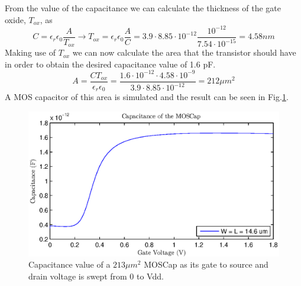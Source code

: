 From the value of the capacitance we can calculate the thickness of the gate oxide, \(T_{ox}\), as
\begin{equation*}
	C = \epsilon_r\epsilon_0\frac{A}{T_{ox}} \rightarrow T_{ox} = \epsilon_r\epsilon_0\frac{A}{C} = 3.9\cdot8.85\cdot10^{-12}\frac{10^{-12}}{7.54\cdot10^{-15}}=4.58 nm
\end{equation*}
Making use of \(T_{ox}\) we can now calculate the area that the transistor should have in order to obtain the desired capacitance value of 1.6 pF.
\begin{equation*}
	A = \frac{CT_{ox}}{\epsilon_r\epsilon_0}=\frac{1.6\cdot10^{-12}\cdot4.58\cdot10^{-9}}{3.9\cdot8.85\cdot10^{-12}} = 212\mu m^2
\end{equation*}
A MOS capacitor of this area is simulated and the result can be seen in Fig.\ref{fig:2}.

\begin{figure}[!h]
	\center
	\includegraphics{exp2.eps}
	\caption{Capacitance value of a \(213 \mu m^2\) MOSCap as its gate to source and drain voltage is swept from 0 to Vdd.}
	\label{fig:2}
\end{figure}

\newpage
